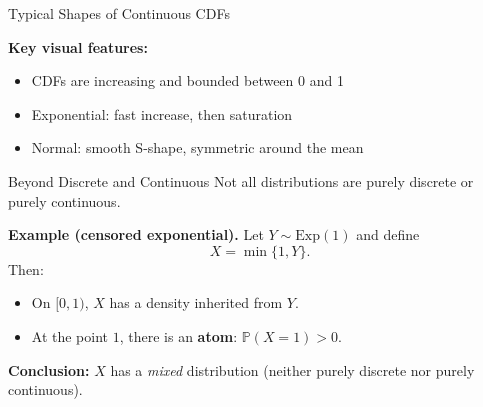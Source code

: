 \documentclass[aspectratio=169]{beamer}
\begin{document}
\begin{frame}{Typical Shapes of Continuous CDFs}

\begin{center}
\end{center}

\medskip
\pause
\textbf{Key visual features:}
\begin{itemize}
  \item CDFs are increasing and bounded between 0 and 1
  \item Exponential: fast increase, then saturation
  \item Normal: smooth S-shape, symmetric around the mean
\end{itemize}

\end{frame}

\begin{frame}{Beyond Discrete and Continuous}
Not all distributions are purely discrete or purely continuous.

\medskip
\pause
\textbf{Example (censored exponential).}
Let \(Y \sim \mathrm{Exp}(1)\) and define
\[
X = \min\{1,Y\}.
\]\pause
Then:
\begin{itemize}
  \item On \([0,1)\), \(X\) has a density inherited from \(Y\).
  \item At the point \(1\), there is an \textbf{atom}:
    \(\mathbb{P}(X=1) > 0\).
\end{itemize}

\medskip
\pause
\textbf{Conclusion:} \(X\) has a \emph{mixed} distribution
(neither purely discrete nor purely continuous).

\end{frame}
\end{document}
